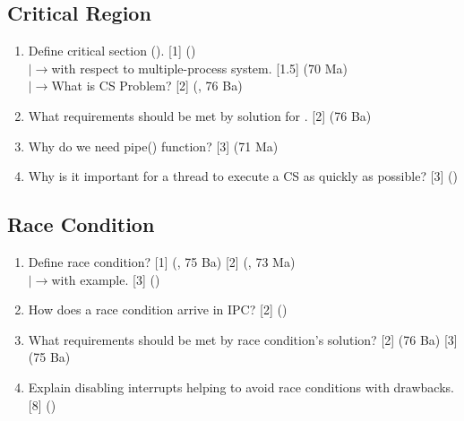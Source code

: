 \documentclass[12pt]{article}
\newcommand{\lb}{\\$\left|\rightarrow\right.$}
\begin{document}
	\subsection{Critical Region}
		\begin{enumerate}[noitemsep, topsep=0pt]
			\item Define critical section ().  \hfill [1] ()
			\lb with respect to multiple-process system. \hfill [1.5] (70 Ma)
			\lb What is CS Problem? \hfill [2] (, 76 Ba)

			\item What requirements should be met by solution for . \hfill [2] (76 Ba)
			
			\item Why do we need pipe() function? \hfill [3] (71 Ma)
			
			\item Why is it important for a thread to execute a CS as quickly as possible? \hfill [3] ()
		\end{enumerate}
		
	\subsection{Race Condition}	
		\begin{enumerate}[noitemsep, topsep=0pt]
			\item Define race condition? \hfill [1] (, 75 Ba) [2] (, 73 Ma)
			\lb with example. \hfill [3] ()

			\item How does a race condition arrive in IPC? \hfill [2] ()
			
			\item What requirements should be met by race condition's solution? \hfill [2] (76 Ba) [3] (75 Ba)
			
			\item Explain disabling interrupts helping to avoid race conditions with drawbacks. \hfill [8] {\small ()}
		\end{enumerate}
		
\end{document}
